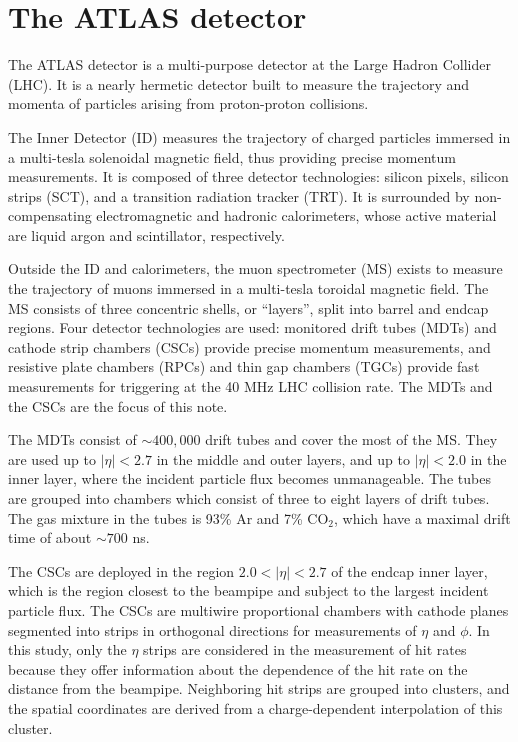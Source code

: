 \section{The ATLAS detector}
\label{sec:detector}

The ATLAS detector is a multi-purpose detector at the Large Hadron Collider (LHC). It is a nearly hermetic detector built to measure the trajectory and momenta of particles arising from proton-proton collisions. 

The Inner Detector (ID) measures the trajectory of charged particles immersed in a multi-tesla solenoidal magnetic field, thus providing precise momentum measurements. It is composed of three detector technologies: silicon pixels, silicon strips (SCT), and a transition radiation tracker (TRT). It is surrounded by non-compensating electromagnetic and hadronic calorimeters, whose active material are liquid argon and scintillator, respectively.

Outside the ID and calorimeters, the muon spectrometer (MS) exists to measure the trajectory of muons immersed in a multi-tesla toroidal magnetic field. The MS consists of three concentric shells, or ``layers'', split into barrel and endcap regions. Four detector technologies are used: monitored drift tubes (MDTs) and cathode strip chambers (CSCs) provide precise momentum measurements, and resistive plate chambers (RPCs) and thin gap chambers (TGCs) provide fast measurements for triggering at the 40 MHz LHC collision rate. The MDTs and the CSCs are the focus of this note.

The MDTs consist of $\sim\!400,000$ drift tubes and cover the most of the MS. They are used up to $|\eta| < 2.7$ in the middle and outer layers, and up to $|\eta| < 2.0$ in the inner layer, where the incident particle flux becomes unmanageable. The tubes are grouped into chambers which consist of three to eight layers of drift tubes. The gas mixture in the tubes is 93\% Ar and 7\% $\text{CO}_2$, which have a maximal drift time of about $\sim\!700$ ns.

The CSCs are deployed in the region $2.0 < |\eta| < 2.7$ of the endcap inner layer, which is the region closest to the beampipe and subject to the largest incident particle flux. The CSCs are multiwire proportional chambers with cathode planes segmented into strips in orthogonal directions for measurements of $\eta$ and $\phi$. In this study, only the $\eta$ strips are considered in the measurement of hit rates because they offer information about the dependence of the hit rate on the distance from the beampipe. Neighboring hit strips are grouped into clusters, and the spatial coordinates are derived from a charge-dependent interpolation of this cluster.

